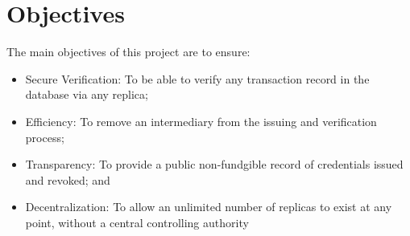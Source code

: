 \section{Objectives}
The main objectives of this project are to ensure:
\begin{itemize}
    \item Secure Verification:
        To be able to verify any transaction record in the database via any replica;
    \item Efficiency: 
        To remove an intermediary from the issuing and verification process;
    \item Transparency: 
        To provide a public non-fundgible record of credentials issued and revoked; and
    \item Decentralization:
        To allow an unlimited number of replicas to exist at any point, without a central
        controlling authority
\end{itemize}

